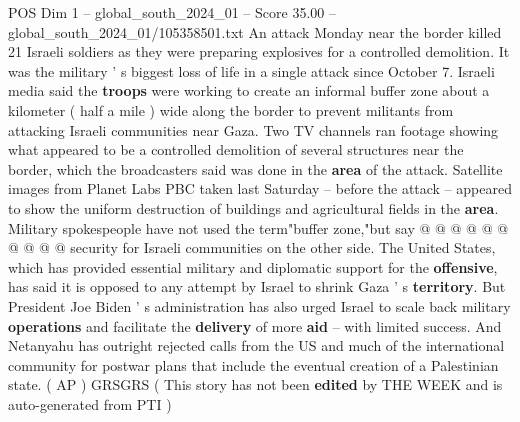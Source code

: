 \begin{textsample}{POS Dim 1 – global\_south\_2024\_01 – Score 35.00 – global\_south\_2024\_01/105358501.txt}
An attack Monday near the border killed 21 Israeli soldiers as they were preparing explosives for a controlled demolition.
It was the military ' s biggest loss of life in a single attack since October 7.
Israeli media said the \textbf{troops} were working to create an informal buffer zone about a kilometer ( half a mile ) wide along the border to prevent militants from attacking Israeli communities near Gaza.
Two TV channels ran footage showing what appeared to be a controlled demolition of several structures near the border, which the broadcasters said was done in the \textbf{area} of the attack.
Satellite images from Planet Labs PBC taken last Saturday -- before the attack -- appeared to show the uniform destruction of buildings and agricultural fields in the \textbf{area}.
Military spokespeople have not used the term"buffer zone,"but say @ @ @ @ @ @ @ @ @ @ security for Israeli communities on the other side.
The United States, which has provided essential military and diplomatic support for the \textbf{offensive}, has said it is opposed to any attempt by Israel to shrink Gaza ' s \textbf{territory}.
But President Joe Biden ' s administration has also urged Israel to scale back military \textbf{operations} and facilitate the \textbf{delivery} of more \textbf{aid} -- with limited success.
And Netanyahu has outright rejected calls from the US and much of the international community for postwar plans that include the eventual creation of a Palestinian state. ( AP ) GRSGRS ( This story has not been \textbf{edited} by THE WEEK and is auto-generated from PTI )

\end{textsample}
